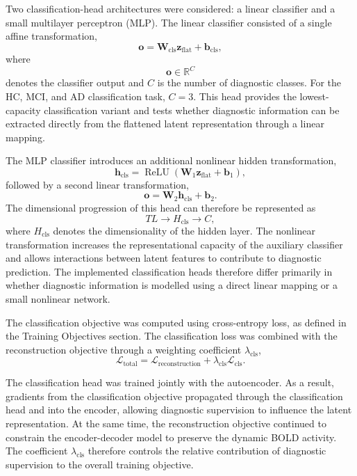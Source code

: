 Two classification-head architectures were considered: a linear classifier
and a small multilayer perceptron (MLP). The linear classifier consisted of
a single affine transformation,
\begin{equation}
    \mathbf{o}
    =
    \mathbf{W}_{\mathrm{cls}}
    \mathbf{z}_{\mathrm{flat}}
    +
    \mathbf{b}_{\mathrm{cls}},
\end{equation}
where
\[
\mathbf{o}\in\mathbb{R}^{C}
\]
denotes the classifier output and $C$ is the number of diagnostic classes.
For the HC, MCI, and AD classification task, $C=3$. This head provides the
lowest-capacity classification variant and tests whether diagnostic
information can be extracted directly from the flattened latent
representation through a linear mapping.

The MLP classifier introduces an additional nonlinear hidden transformation,
\begin{equation}
    \mathbf{h}_{\mathrm{cls}}
    =
    \operatorname{ReLU}
    \left(
        \mathbf{W}_{1}
        \mathbf{z}_{\mathrm{flat}}
        +
        \mathbf{b}_{1}
    \right),
\end{equation}
followed by a second linear transformation,
\begin{equation}
    \mathbf{o}
    =
    \mathbf{W}_{2}
    \mathbf{h}_{\mathrm{cls}}
    +
    \mathbf{b}_{2}.
\end{equation}
The dimensional progression of this head can therefore be represented as
\[
TL
\rightarrow
H_{\mathrm{cls}}
\rightarrow
C,
\]
where $H_{\mathrm{cls}}$ denotes the dimensionality of the hidden layer.
The nonlinear transformation increases the representational capacity of
the auxiliary classifier and allows interactions between latent features
to contribute to diagnostic prediction. The implemented classification
heads therefore differ primarily in whether diagnostic information is
modelled using a direct linear mapping or a small nonlinear network.


The classification objective was computed using cross-entropy loss, as
defined in the Training Objectives section. The classification loss was
combined with the reconstruction objective through a weighting coefficient
$\lambda_{\mathrm{cls}}$,
\begin{equation}
    \mathcal{L}_{\mathrm{total}}
    =
    \mathcal{L}_{\mathrm{reconstruction}}
    +
    \lambda_{\mathrm{cls}}
    \mathcal{L}_{\mathrm{cls}}.
\end{equation}

The classification head was trained jointly with the autoencoder. As a
result, gradients from the classification objective propagated through the
classification head and into the encoder, allowing diagnostic supervision
to influence the latent representation. At the same time, the
reconstruction objective continued to constrain the encoder-decoder model
to preserve the dynamic BOLD activity. The coefficient
$\lambda_{\mathrm{cls}}$ therefore controls the relative contribution of
diagnostic supervision to the overall training objective.

